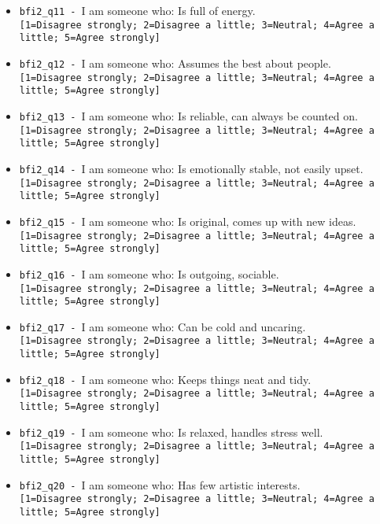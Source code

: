 \begin{description}
\begin{addmargin}[0em]{0em}
\begin{addmargin}[1em]{0em}
\begin{itemize}
            \item \verb|bfi2_q11 - |I am someone who: Is full of energy.\\\verb|[1=Disagree strongly; 2=Disagree a little; 3=Neutral; 4=Agree a little; 5=Agree strongly]|
            \item \verb|bfi2_q12 - |I am someone who: Assumes the best about people.\\\verb|[1=Disagree strongly; 2=Disagree a little; 3=Neutral; 4=Agree a little; 5=Agree strongly]|
            \item \verb|bfi2_q13 - |I am someone who: Is reliable, can always be counted on.\\\verb|[1=Disagree strongly; 2=Disagree a little; 3=Neutral; 4=Agree a little; 5=Agree strongly]|
            \item \verb|bfi2_q14 - |I am someone who: Is emotionally stable, not easily upset.\\\verb|[1=Disagree strongly; 2=Disagree a little; 3=Neutral; 4=Agree a little; 5=Agree strongly]|
            \item \verb|bfi2_q15 - |I am someone who: Is original, comes up with new ideas.\\\verb|[1=Disagree strongly; 2=Disagree a little; 3=Neutral; 4=Agree a little; 5=Agree strongly]|
            \item \verb|bfi2_q16 - |I am someone who: Is outgoing, sociable.\\\verb|[1=Disagree strongly; 2=Disagree a little; 3=Neutral; 4=Agree a little; 5=Agree strongly]|
            \item \verb|bfi2_q17 - |I am someone who: Can be cold and uncaring.\\\verb|[1=Disagree strongly; 2=Disagree a little; 3=Neutral; 4=Agree a little; 5=Agree strongly]|
            \item \verb|bfi2_q18 - |I am someone who: Keeps things neat and tidy.\\\verb|[1=Disagree strongly; 2=Disagree a little; 3=Neutral; 4=Agree a little; 5=Agree strongly]|
            \item \verb|bfi2_q19 - |I am someone who: Is relaxed, handles stress well.\\\verb|[1=Disagree strongly; 2=Disagree a little; 3=Neutral; 4=Agree a little; 5=Agree strongly]|
            \item \verb|bfi2_q20 - |I am someone who: Has few artistic interests.\\\verb|[1=Disagree strongly; 2=Disagree a little; 3=Neutral; 4=Agree a little; 5=Agree strongly]|

\end{itemize}
\end{addmargin}
\end{addmargin}
\end{description}
